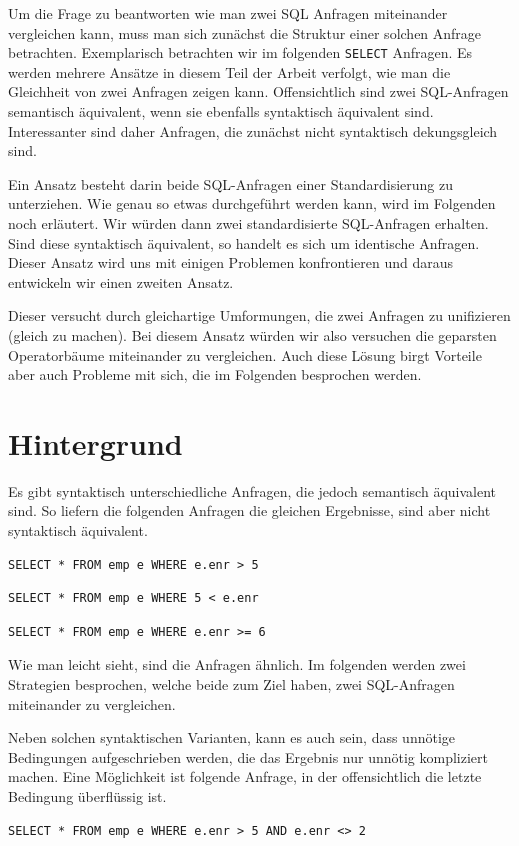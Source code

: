 Um die Frage zu beantworten wie man zwei SQL Anfragen miteinander vergleichen kann, muss man sich zunächst die Struktur einer solchen Anfrage betrachten. Exemplarisch betrachten wir im folgenden \verb|SELECT| Anfragen. Es werden mehrere Ansätze in diesem Teil der Arbeit verfolgt, wie man die Gleichheit von zwei Anfragen zeigen kann. Offensichtlich sind zwei SQL-Anfragen semantisch äquivalent, wenn sie ebenfalls syntaktisch äquivalent sind. Interessanter sind daher Anfragen, die zunächst nicht syntaktisch dekungsgleich sind. 

Ein Ansatz besteht darin beide SQL-Anfragen einer Standardisierung zu unterziehen. Wie genau so etwas durchgeführt werden kann, wird im Folgenden noch erläutert. Wir würden dann zwei standardisierte SQL-Anfragen erhalten. Sind diese syntaktisch äquivalent, so handelt es sich um identische Anfragen. Dieser Ansatz wird uns mit einigen Problemen konfrontieren und daraus entwickeln wir einen zweiten Ansatz. 

Dieser versucht durch gleichartige Umformungen, die zwei Anfragen zu unifizieren (gleich zu machen). Bei diesem Ansatz würden wir also versuchen die geparsten Operatorbäume miteinander zu vergleichen. Auch diese Lösung birgt Vorteile aber auch Probleme mit sich, die im Folgenden besprochen werden.

\section{Hintergrund}

Es gibt syntaktisch unterschiedliche Anfragen, die jedoch semantisch äquivalent sind. So liefern die folgenden Anfragen die gleichen Ergebnisse, sind aber nicht syntaktisch äquivalent.

\begin{verbatim}
SELECT * FROM emp e WHERE e.enr > 5
\end{verbatim}

\begin{verbatim}
SELECT * FROM emp e WHERE 5 < e.enr
\end{verbatim}

\begin{verbatim}
SELECT * FROM emp e WHERE e.enr >= 6
\end{verbatim}

Wie man leicht sieht, sind die Anfragen ähnlich. Im folgenden werden zwei Strategien besprochen, welche beide zum Ziel haben, zwei SQL-Anfragen miteinander zu vergleichen.

Neben solchen syntaktischen Varianten, kann es auch sein, dass unnötige Bedingungen aufgeschrieben werden, die das Ergebnis nur unnötig kompliziert machen. Eine Möglichkeit ist folgende Anfrage, in der offensichtlich die letzte Bedingung überflüssig ist.
\begin{verbatim}
SELECT * FROM emp e WHERE e.enr > 5 AND e.enr <> 2
\end{verbatim}

